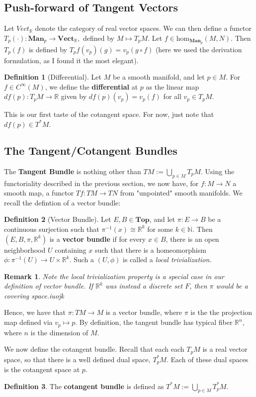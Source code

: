 \documentclass{article}
\newtheorem{remark}{Remark}
\theoremstyle{definition}
\newtheorem{defn}{Definition}[section]
\newcommand{\N}{\mathbb{N}}
\newcommand{\R}{\mathbb{R}}
\newcommand{\cat}{\mathbf}
\begin{document}
\subsection{Push-forward of Tangent Vectors}
Let $Vect_{\R}$ denote the category of real vector spaces. We can then define a functor $T_{p}(\cdot):\cat{Man}_{p}\rightarrow\cat{Vect}_{\R},$ defined by $M\mapsto T_{p}M$. Let $f\in\text{hom}_{\cat{Man}_{p}}(M,N)$. Then $T_{p}(f)$ is defined by $T_{p}f(v_{p})(g)=v_{p}(g\circ f)$ (here we used the derivation formulation, as I found it the most elegant).
\begin{defn}[Differential]
Let $M$ be a smooth manifold, and let $p\in M$. For $f\in C^{\infty}(M)$, we define the \textbf{differential} at $p$ as the linear map $df(p):T_{p}M\rightarrow\R$ given by $df(p)(v_{p})=v_{p}(f)$ for all $v_{p}\in T_{p}M$.
\end{defn}
This is our first taste of the cotangent space. For now, just note that $df(p)\in T^{\ast}M.$
\subsection{The Tangent/Cotangent Bundles}
The \textbf{Tangent Bundle} is nothing other than $TM:=\bigcup_{p\in M}T_{p}M.$ Using the functoriality described in the previous section, we now have, for $f:M\rightarrow N$ a smooth map, a functor $Tf:TM\rightarrow TN$ from "unpointed" smooth manifolds. We recall the defintion of a vector bundle:
\begin{defn}[Vector Bundle]
Let $E,B\in\cat{Top}$, and let $\pi:E\rightarrow B$ be a continuous surjection such that $\pi^{-1}(x)\cong\R^{k}$ for some $k\in\N$. Then $(E,B,\pi,\R^{k})$ is a \textbf{vector bundle} if for every $x\in B$, there is an open neighborhood $U$ containing $x$ such that there is a homeomorphism $\phi:\pi^{-1}(U)\rightarrow U\times\R^{k}.$ Such a $(U,\phi)$ is called a \textit{local trivialization}.
\end{defn}
\begin{remark}
Note the local trivialization property is a special case in our definition of vector bundle. If $\mathbb{R}^k$ was instead a discrete set $F$, then $\pi$ would be a covering space.iuojk
\end{remark}
Hence, we have that $\pi:TM\rightarrow M$ is a vector bundle, where $\pi$ is the the projection map defined via $v_{p}\mapsto p$. By definition, the tangent bundle has typical fiber $\R^{n}$, where $n$ is the dimension of $M$.

We now define the cotangent bundle. Recall that each each $T_{p}M$ is a real vector space, so that there is a well defined dual space, $T_{p}^{*}M$. Each of these dual spaces is the cotangent space at $p$. 
\begin{defn}
The \textbf{cotangent bundle} is defined as $T^{*}M:=\bigcup_{p\in M}T_{p}^{*}M.$
\end{defn}
\end{document}
